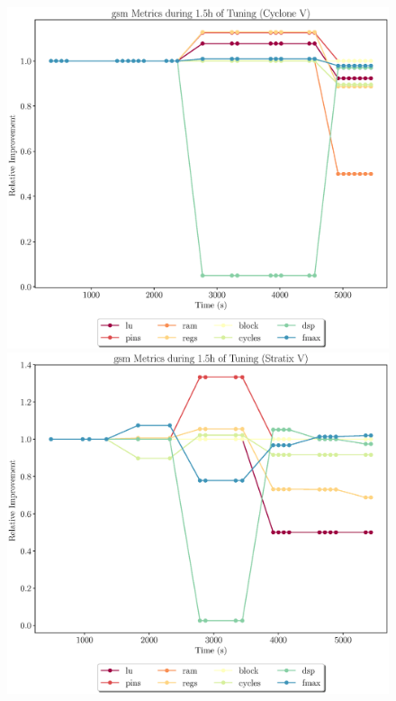\documentclass[12pt, a4paper]{article}
\begin{document}
\newpage

\begin{figure}[htpb]
    \centering
    \begin{minipage}{.48\textwidth}
        \includegraphics[scale=.29]{gsm_all_5400_chstone_CycloneV}
    \end{minipage}%
    \hfill
    \begin{minipage}{.48\textwidth}
        \includegraphics[scale=.29]{gsm_all_5400_chstone_StratixV}
    \end{minipage}%


\end{figure}
\end{document}
